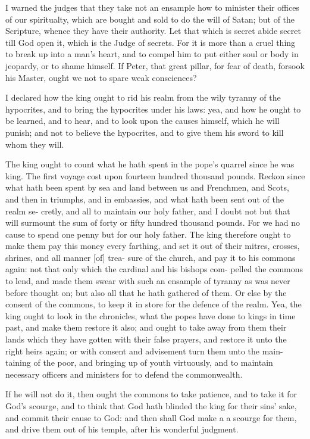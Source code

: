 \documentclass{custom}
\begin{document}
I warned the judges that they take not an ensample 
how to minister their offices of our spiritualty, which are 
bought and sold to do the will of Satan; but of the 
Scripture, whence they have their authority. Let that 
which is secret abide secret till God open it, which is the 
Judge of secrets. For it is more than a cruel thing to 
break up into a man's heart, and to compel him to put 
either soul or body in jeopardy, or to shame himself. If 
Peter, that great pillar, for fear of death, forsook his 
Master, ought we not to spare weak consciences? 

I declared how the king ought to rid his realm from the 
wily tyranny of the hypocrites, and to bring the hypocrites 
under his laws: yea, and how he ought to be learned, and 
to hear, and to look upon the causes himself, which he 
will punish; and not to believe the hypocrites, and to 
give them his sword to kill whom they will. 

The king ought to count what he hath spent in the 
pope's quarrel since he was king. The first voyage 
cost upon fourteen hundred thousand pounds. Reckon 
since what hath been spent by sea and land between us 
and Frenchmen, and Scots, and then in triumphs, and in 
embassies, and what hath been sent out of the realm se- 
cretly, and all to maintain our holy father, and I doubt 
not but that will surmount the sum of forty or fifty hundred 
thousand pounds. For we had no cause to spend one 
penny but for our holy father. The king therefore ought 
to make them pay this money every farthing, and set it out 
of their mitres, crosses, shrines, and all manner [of] trea- 
sure of the church, and pay it to his commons again: 
not that only which the cardinal and his bishops com- 
pelled the commons to lend, and made them swear with 
such an ensample of tyranny as was never before thought 
on; but also all that he hath gathered of them. Or else 
by the consent of the commons, to keep it in store for the 
defence of the realm. Yea, the king ought to look in 
the chronicles, what the popes have done to kings in time 
past, and make them restore it also; and ought to take 
away from them their lands which they have gotten with 
their false prayers, and restore it unto the right heirs again; 
or with consent and advisement turn them unto the main- 
taining of the poor, and bringing up of youth virtuously, 
and to maintain necessary officers and ministers for to 
defend the commonwealth. 

If he will not do it, then ought the commons to take 
patience, and to take it for God's scourge, and to think 
that God hath blinded the king for their sins' sake, and 
commit their cause to God: and then shall God make a 
a scourge for them, and drive them out of his temple, 
after his wonderful judgment. 
\end{document}
